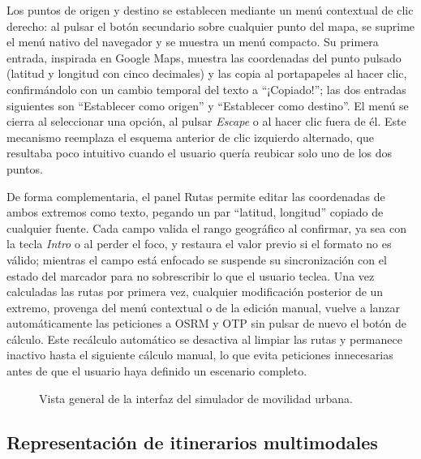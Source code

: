Los puntos de origen y destino se establecen mediante un menú contextual de clic derecho: al pulsar el botón secundario sobre cualquier punto del mapa, se suprime el menú nativo del navegador y se muestra un menú compacto. Su primera entrada, inspirada en Google Maps, muestra las coordenadas del punto pulsado (latitud y longitud con cinco decimales) y las copia al portapapeles al hacer clic, confirmándolo con un cambio temporal del texto a ``¡Copiado!''; las dos entradas siguientes son ``Establecer como origen'' y ``Establecer como destino''. El menú se cierra al seleccionar una opción, al pulsar \textit{Escape} o al hacer clic fuera de él. Este mecanismo reemplaza el esquema anterior de clic izquierdo alternado, que resultaba poco intuitivo cuando el usuario quería reubicar solo uno de los dos puntos.

De forma complementaria, el panel Rutas permite editar las coordenadas de ambos extremos como texto, pegando un par ``latitud, longitud'' copiado de cualquier fuente. Cada campo valida el rango geográfico al confirmar, ya sea con la tecla \textit{Intro} o al perder el foco, y restaura el valor previo si el formato no es válido; mientras el campo está enfocado se suspende su sincronización con el estado del marcador para no sobrescribir lo que el usuario teclea. Una vez calculadas las rutas por primera vez, cualquier modificación posterior de un extremo, provenga del menú contextual o de la edición manual, vuelve a lanzar automáticamente las peticiones a OSRM y OTP sin pulsar de nuevo el botón de cálculo. Este recálculo automático se desactiva al limpiar las rutas y permanece inactivo hasta el siguiente cálculo manual, lo que evita peticiones innecesarias antes de que el usuario haya definido un escenario completo.

\begin{figure}[htbp]
  \centering
  \caption{Vista general de la interfaz del simulador de movilidad urbana.}
  \label{fig:app_general}
\end{figure}

\subsection{Representación de itinerarios multimodales}
\label{subsec:impl_frontend_legs}

